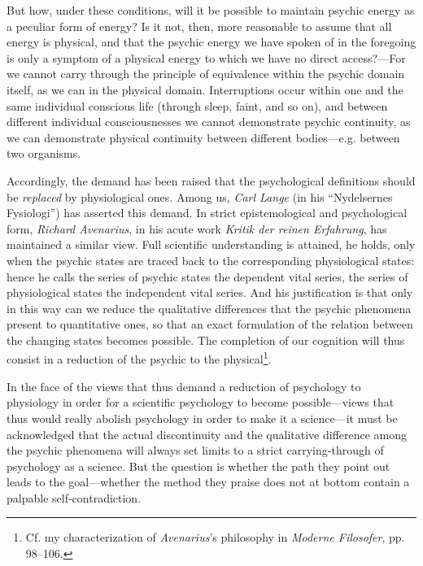 \documentclass[12pt,a4paper]{book}
\newcommand{\opage}[1]{\marginnote{\footnotesize\textit{[#1]}}}
\begin{document}
\opage{24}But how, under these conditions, will it be possible to maintain psychic
energy as a peculiar form of energy? Is it not, then, more reasonable to
assume that all energy is physical, and that the psychic energy we have
spoken of in the foregoing is only a symptom of a physical energy to
which we have no direct access?---For we cannot carry through the
principle of equivalence within the psychic domain itself, as we can in
the physical domain. Interruptions occur within one and the same
individual conscious life (through sleep, faint, and so on), and between
different individual consciousnesses we cannot demonstrate psychic
continuity, as we can demonstrate physical continuity between different
bodies---e.g. between two organisms.

Accordingly, the demand has been raised that the psychological
definitions should be \emph{replaced} by physiological ones. Among us,
\emph{Carl Lange} (in his ``Nydelsernes Fysiologi'') has asserted this
demand. In strict epistemological and psychological form,
\emph{Richard Avenarius}, in his acute work \emph{Kritik der reinen
Erfahrung}, has maintained a similar view. Full scientific understanding
is attained, he holds, only when the psychic states are traced back to
the corresponding physiological states: hence he calls the series of
psychic states the dependent vital series, the series of physiological
states the independent vital series. And his justification is that only
in this way can we reduce the qualitative differences that the psychic
phenomena present to quantitative ones, so that an exact formulation of
the relation between the changing states becomes possible. The
completion of our cognition will thus consist in a reduction of the
psychic to the physical\footnote{Cf. my characterization of
\emph{Avenarius}'s philosophy in \emph{Moderne Filosofer}, pp.
98--106.}.

In the face of the views that thus demand a reduction of psychology to
physiology in order for a scientific psychology to become possible---views
that thus would really abolish psychology in order to make it a
science---it must be acknowledged that the actual discontinuity and the
qualitative difference \opage{25}among the psychic phenomena will always set
limits to a strict carrying-through of psychology as a science. But the
question is whether the path they point out leads to the goal---whether
the method they praise does not at bottom contain a palpable
self-contradiction.
\end{document}
